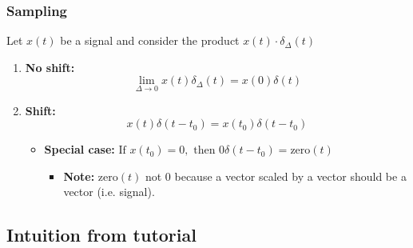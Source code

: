     \subsubsection{Sampling}
    \begin{definition}
        Let $x(t)$ be a signal and consider the product $x(t) \cdot \delta_{\Delta} (t)$

        \begin{enumerate}
            \item \textbf{No shift:}
            \begin{equation}
                \lim_{\Delta \to 0} x(t) \delta_{\Delta}(t) = x(0) \delta(t)
            \end{equation}

            \item \textbf{Shift:}
            \begin{equation}
                x(t) \delta(t - t_0) = x(t_0) \delta(t - t_0)                
            \end{equation}

            \begin{itemize}
                \item \textbf{Special case:} $\text{If } x(t_0) = 0, \text{ then } 0 \delta(t - t_0) = \text{zero}(t)$ 
                \begin{itemize}
                    \item \textbf{Note:} $\text{zero}(t)$ not $0$ because a vector scaled by a vector should be a vector (i.e. signal).
                \end{itemize}
            \end{itemize} 
        \end{enumerate}
    \end{definition}

    \subsection{Intuition from tutorial}
